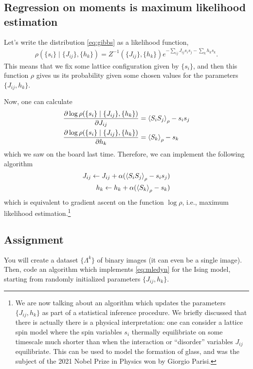 \documentclass[11pt]{article}
\begin{document}
\subsection{Regression on moments is maximum likelihood estimation}
\label{sec:orgb4b2aca}
Let's write the distribution \eqref{eq:gibbs} as a likelihood function,
\begin{align*}
\rho(\{s_{i}\} \mid \{J_{ij}\}, \{h_{k}\}) = Z^{-1}(\{J_{ij}\}, \{h_{k}\})
e^{-\sum_{ij} J_{ij}s_{i}s_{j} -\sum_{k} h_{k}s_{k}}.
\end{align*}
This means that we fix some lattice configuration given by \(\{s_{i}\}\), and
then this function \(\rho\) gives us its probability given some chosen values
for the parameters \(\{J_{ij}, h_{k}\}\).

Now, one can calculate
\begin{align*}
\pdv{\log \rho(\{s_{i}\} \mid \{J_{ij}\}, \{h_{k}\})}{J_{ij}} &= \ev{S_{i}S_{j}}_{\rho} - s_{i}s_{j} \\
\pdv{\log \rho(\{s_{i}\} \mid \{J_{ij}\}, \{h_{k}\})}{h_{k}} &= \ev{S_{k}}_{\rho} - s_{k}
\end{align*}
which we saw on the board last time. Therefore, we can implement the following algorithm
\begin{align}
\label{eq:mledyn}
\begin{split}
J_{ij} \leftarrow J_{ij} + \alpha(\ev{S_{i}S_{j}}_{\rho} - s_{i}s_{j}) \\
h_{k} \leftarrow h_{k} + \alpha(\ev{S_{k}}_{\rho} - s_{k})
\end{split}
\end{align}
which is equivalent to gradient ascent on the function \(\log \rho\), i.e.,
maximum likelihood estimation.\footnote{We are now talking about an algorithm which updates the parameters
\(\{J_{ij}, h_{k}\}\) as part of a statistical inference procedure. We briefly
discussed that there is actually there is a physical interpretation: one can
consider a lattice spin model where the spin variables \(s_{i}\) thermally
equilibriate on some timescale much shorter than when the interaction or
``disorder'' variables \(J_{ij}\) equilibriate. This can be used to model the
formation of glass, and was the subject of the 2021 Nobel Prize in Physics won
by Giorgio Parisi.}
\subsection{Assignment}
\label{sec:orgf47a59f}
You will create a dataset \(\{\Lambda^{k}\}\) of binary images (it can even be a
single image). Then, code an algorithm which implements \eqref{eq:mledyn} for
the Ising model, starting from randomly initialized parameters \(\{J_{ij},
h_{k}\}\).
\end{document}
